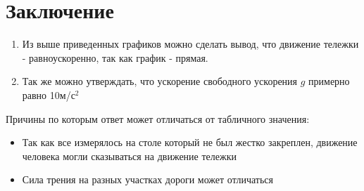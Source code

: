 \documentclass[a4paper]{article}
\begin{document}
\section{Заключение}

\begin{enumerate}
	\item Из выше приведенных графиков можно сделать вывод, что движение тележки - равноускоренно, так как график - прямая.
\item Так же можно утверждать, что ускорение свободного ускорения $g$ примерно равно 10м/с$^2$
\end{enumerate}

Причины по которым ответ может отличаться от табличного значения:
\begin{itemize}
	\item Так как все измерялось на столе который не был жестко закреплен, движение человека могли сказываться на движение тележки
	\item Сила трения на разных участках дороги может отличаться
\end{itemize}
\end{document}
